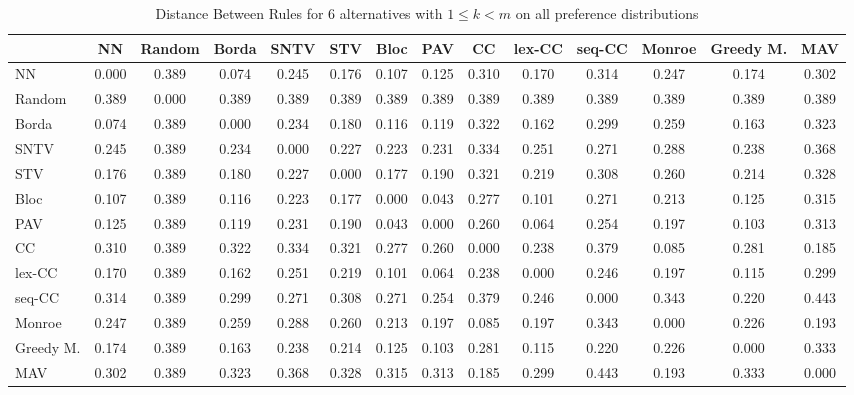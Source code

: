 
\begin{table*}
\centering
\begin{tabular}{lccccccccccccc}
\toprule
 & NN & Random & Borda & SNTV & STV & Bloc & PAV & CC & lex-CC & seq-CC & Monroe & Greedy M. & MAV \\
\midrule
NN & 0.000 & 0.389 & 0.074 & 0.245 & 0.176 & 0.107 & 0.125 & 0.310 & 0.170 & 0.314 & 0.247 & 0.174 & 0.302 \\
Random & 0.389 & 0.000 & 0.389 & 0.389 & 0.389 & 0.389 & 0.389 & 0.389 & 0.389 & 0.389 & 0.389 & 0.389 & 0.389 \\
Borda & 0.074 & 0.389 & 0.000 & 0.234 & 0.180 & 0.116 & 0.119 & 0.322 & 0.162 & 0.299 & 0.259 & 0.163 & 0.323 \\
SNTV & 0.245 & 0.389 & 0.234 & 0.000 & 0.227 & 0.223 & 0.231 & 0.334 & 0.251 & 0.271 & 0.288 & 0.238 & 0.368 \\
STV & 0.176 & 0.389 & 0.180 & 0.227 & 0.000 & 0.177 & 0.190 & 0.321 & 0.219 & 0.308 & 0.260 & 0.214 & 0.328 \\
Bloc & 0.107 & 0.389 & 0.116 & 0.223 & 0.177 & 0.000 & 0.043 & 0.277 & 0.101 & 0.271 & 0.213 & 0.125 & 0.315 \\
PAV & 0.125 & 0.389 & 0.119 & 0.231 & 0.190 & 0.043 & 0.000 & 0.260 & 0.064 & 0.254 & 0.197 & 0.103 & 0.313 \\
CC & 0.310 & 0.389 & 0.322 & 0.334 & 0.321 & 0.277 & 0.260 & 0.000 & 0.238 & 0.379 & 0.085 & 0.281 & 0.185 \\
lex-CC & 0.170 & 0.389 & 0.162 & 0.251 & 0.219 & 0.101 & 0.064 & 0.238 & 0.000 & 0.246 & 0.197 & 0.115 & 0.299 \\
seq-CC & 0.314 & 0.389 & 0.299 & 0.271 & 0.308 & 0.271 & 0.254 & 0.379 & 0.246 & 0.000 & 0.343 & 0.220 & 0.443 \\
Monroe & 0.247 & 0.389 & 0.259 & 0.288 & 0.260 & 0.213 & 0.197 & 0.085 & 0.197 & 0.343 & 0.000 & 0.226 & 0.193 \\
Greedy M. & 0.174 & 0.389 & 0.163 & 0.238 & 0.214 & 0.125 & 0.103 & 0.281 & 0.115 & 0.220 & 0.226 & 0.000 & 0.333 \\
MAV & 0.302 & 0.389 & 0.323 & 0.368 & 0.328 & 0.315 & 0.313 & 0.185 & 0.299 & 0.443 & 0.193 & 0.333 & 0.000 \\
\bottomrule
\end{tabular}

\caption{Distance Between Rules for 6 alternatives with $1 \leq k < m$ on all preference distributions}
\end{table*}
